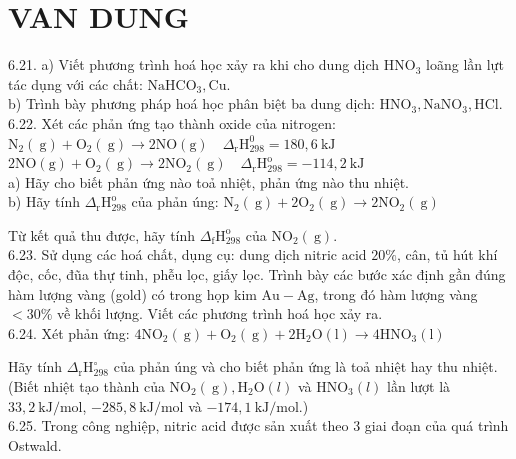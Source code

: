 \documentclass[10pt]{article}
\begin{document}
\section*{VAN DUNG}
6.21. a) Viết phương trình hoá học xảy ra khi cho dung dịch $\mathrm{HNO}_{3}$ loãng lần lựt tác dụng với các chất: $\mathrm{NaHCO}_{3}, \mathrm{Cu}$.\\
b) Trình bày phương pháp hoá học phân biệt ba dung dịch: $\mathrm{HNO}_{3}, \mathrm{NaNO}_{3}, \mathrm{HCl}$.\\
6.22. Xét các phản ứng tạo thành oxide của nitrogen:\\
$\mathrm{N}_{2}(\mathrm{~g})+\mathrm{O}_{2}(\mathrm{~g}) \longrightarrow 2 \mathrm{NO}(\mathrm{g}) \quad \Delta_{\mathrm{r}} \mathrm{H}_{298}^{0}=180,6 \mathrm{~kJ}$\\
$2 \mathrm{NO}(\mathrm{g})+\mathrm{O}_{2}(\mathrm{~g}) \longrightarrow 2 \mathrm{NO}_{2}(\mathrm{~g}) \quad \Delta_{\mathrm{r}} \mathrm{H}_{298}^{\mathrm{o}}=-114,2 \mathrm{~kJ}$\\
a) Hãy cho biết phản ứng nào toả nhiệt, phản ứng nào thu nhiệt.\\
b) Hãy tính $\Delta_{\mathrm{r}} \mathrm{H}_{298}^{\mathrm{o}}$ của phản úng: $\mathrm{N}_{2}(\mathrm{~g})+2 \mathrm{O}_{2}(\mathrm{~g}) \longrightarrow 2 \mathrm{NO}_{2}(\mathrm{~g})$

Từ kết quả thu được, hãy tính $\Delta_{\mathrm{f}} \mathrm{H}_{298}^{\mathrm{o}}$ của $\mathrm{NO}_{2}(\mathrm{~g})$.\\
6.23. Sử dụng các hoá chất, dụng cụ: dung dịch nitric acid $20 \%$, cân, tủ hút khí độc, cốc, đũa thự tinh, phễu lọc, giấy lọc. Trình bày các bước xác định gần đúng hàm lượng vàng (gold) có trong họp kim $\mathrm{Au}-\mathrm{Ag}$, trong đó hàm lượng vàng $<30 \%$ về khối lượng. Viết các phương trình hoá học xảy ra.\\
6.24. Xét phản ứng: $4 \mathrm{NO}_{2}(\mathrm{~g})+\mathrm{O}_{2}(\mathrm{~g})+2 \mathrm{H}_{2} \mathrm{O}(\mathrm{l}) \longrightarrow 4 \mathrm{HNO}_{3}(\mathrm{l})$

Hãy tính $\Delta_{\mathrm{r}} \mathrm{H}_{298}^{\circ}$ của phản úng và cho biết phản ứng là toả nhiệt hay thu nhiệt. (Biết nhiệt tạo thành của $\mathrm{NO}_{2}(\mathrm{~g}), \mathrm{H}_{2} \mathrm{O}(l)$ và $\mathrm{HNO}_{3}(l)$ lần lượt là $33,2 \mathrm{~kJ} / \mathrm{mol}$, $-285,8 \mathrm{~kJ} / \mathrm{mol}$ và $-174,1 \mathrm{~kJ} / \mathrm{mol}$.)\\
6.25. Trong công nghiệp, nitric acid được sản xuất theo 3 giai đoạn của quá trình Ostwald.
\end{document}
